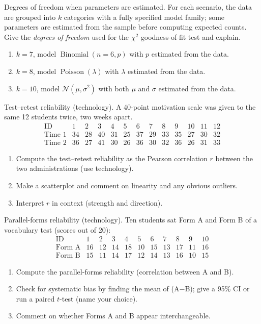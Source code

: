 \documentclass[11pt]{article}
\def\textbf#1{#1}%
\newcounter{question}
\begin{document}
\begin{question}
\textbf{Degrees of freedom when parameters are estimated.}
For each scenario, the data are grouped into $k$ categories with a fully specified model family; some parameters are estimated from the sample before computing expected counts. Give the \emph{degrees of freedom} used for the $\chi^2$ goodness-of-fit test and explain.
\begin{enumerate}
  \item $k=7$, model $\operatorname{Binomial}(n=6,p)$ with $p$ estimated from the data.
  \item $k=8$, model $\operatorname{Poisson}(\lambda)$ with $\lambda$ estimated from the data.
  \item $k=10$, model $\mathcal N(\mu,\sigma^2)$ with both $\mu$ and $\sigma$ estimated from the data.
\end{enumerate}
\end{question}

\begin{question}
\textbf{Test–retest reliability (technology).}
A 40-point motivation scale was given to the same 12 students twice, two weeks apart.
\[
\begin{array}{c|cccccccccccc}
\text{ID} & 1&2&3&4&5&6&7&8&9&10&11&12\\\hline
\text{Time 1} & 34&28&40&31&25&37&29&33&35&27&30&32\\
\text{Time 2} & 36&27&41&30&26&36&30&32&36&26&31&33
\end{array}
\]
\begin{enumerate}
  \item Compute the test–retest reliability as the Pearson correlation $r$ between the two administrations (use technology).
  \item Make a scatterplot and comment on linearity and any obvious outliers.
  \item Interpret $r$ in context (strength and direction).
\end{enumerate}
\end{question}

\begin{question}
\textbf{Parallel-forms reliability (technology).}
Ten students sat Form A and Form B of a vocabulary test (scores out of 20):
\[
\begin{array}{c|cccccccccc}
\text{ID} & 1&2&3&4&5&6&7&8&9&10\\\hline
\text{Form A} & 16&12&14&18&10&15&13&17&11&16\\
\text{Form B} & 15&11&14&17&12&14&13&16&10&15
\end{array}
\]
\begin{enumerate}
  \item Compute the parallel-forms reliability (correlation between A and B).
  \item Check for systematic bias by finding the mean of (A$-$B); give a 95\% CI or run a paired $t$-test (name your choice).
  \item Comment on whether Forms A and B appear interchangeable.
\end{enumerate}
\end{question}
\end{document}

